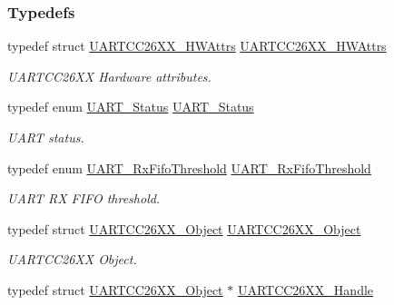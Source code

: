 \subsubsection*{Typedefs}
\begin{DoxyCompactItemize}
\item 
typedef struct \hyperlink{struct_u_a_r_t_c_c26_x_x___h_w_attrs}{U\-A\-R\-T\-C\-C26\-X\-X\-\_\-\-H\-W\-Attrs} \hyperlink{_u_a_r_t_c_c26_x_x_8h_a779ad8f4640de879a0cdf41f4274206d}{U\-A\-R\-T\-C\-C26\-X\-X\-\_\-\-H\-W\-Attrs}
\begin{DoxyCompactList}\small\item\em U\-A\-R\-T\-C\-C26\-X\-X Hardware attributes. \end{DoxyCompactList}\item 
typedef enum \hyperlink{_u_a_r_t_c_c26_x_x_8h_a778bbef5f4b52a5651552136715f53c4}{U\-A\-R\-T\-\_\-\-Status} \hyperlink{_u_a_r_t_c_c26_x_x_8h_a27818b82da9cf35d1f0f228b1f69b036}{U\-A\-R\-T\-\_\-\-Status}
\begin{DoxyCompactList}\small\item\em U\-A\-R\-T status. \end{DoxyCompactList}\item 
typedef enum \hyperlink{_u_a_r_t_c_c26_x_x_8h_ae4d3bdbfa5106a07c6965f3fe40f8c8a}{U\-A\-R\-T\-\_\-\-Rx\-Fifo\-Threshold} \hyperlink{_u_a_r_t_c_c26_x_x_8h_a95c4e8ad93163c7af4c519b0fbd2dffe}{U\-A\-R\-T\-\_\-\-Rx\-Fifo\-Threshold}
\begin{DoxyCompactList}\small\item\em U\-A\-R\-T R\-X F\-I\-F\-O threshold. \end{DoxyCompactList}\item 
typedef struct \hyperlink{struct_u_a_r_t_c_c26_x_x___object}{U\-A\-R\-T\-C\-C26\-X\-X\-\_\-\-Object} \hyperlink{_u_a_r_t_c_c26_x_x_8h_a41437180bc6a286da889dc2aae1c001c}{U\-A\-R\-T\-C\-C26\-X\-X\-\_\-\-Object}
\begin{DoxyCompactList}\small\item\em U\-A\-R\-T\-C\-C26\-X\-X Object. \end{DoxyCompactList}\item 
typedef struct \hyperlink{struct_u_a_r_t_c_c26_x_x___object}{U\-A\-R\-T\-C\-C26\-X\-X\-\_\-\-Object} $\ast$ \hyperlink{_u_a_r_t_c_c26_x_x_8h_a276d493f1689ad8c16b5cfb4dada194a}{U\-A\-R\-T\-C\-C26\-X\-X\-\_\-\-Handle}
\end{DoxyCompactItemize}
